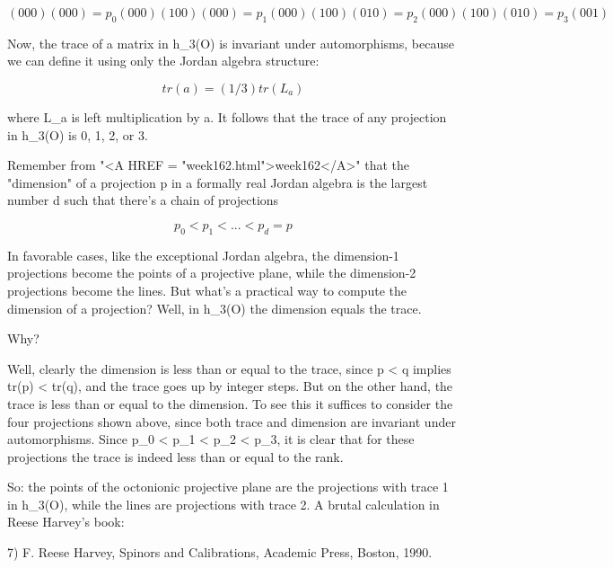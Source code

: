 $$

       ( 0    0    0 )        
       ( 0    0    0 ) = p_{0} 
       ( 0    0    0 )


       ( 1    0    0 )        
       ( 0    0    0 ) = p_{1} 
       ( 0    0    0 ) 


       ( 1    0    0 )        
       ( 0    1    0 ) = p_{2} 
       ( 0    0    0 )


       ( 1    0    0 )       
       ( 0    1    0 ) = p_{3} 
       ( 0    0    1 )
$$
    

Now, the trace of a matrix in h_{3}(O) is invariant under
automorphisms, because we can define it using only the Jordan algebra
structure:


$$

tr(a) = (1/3) tr(L_{a})    
$$
    
where L_{a} is left multiplication by a.  It follows that the trace
of any projection in h_{3}(O) is 0, 1, 2, or 3.  

Remember from "<A HREF = "week162.html">week162</A>" that the
"dimension" of a projection p in a formally real Jordan
algebra is the largest number d such that there's a chain of projections


$$

         p_{0} < p_{1} < ... < p_{d} = p  
$$
    
In favorable cases, like the exceptional Jordan algebra, the dimension-1
projections become the points of a projective plane, while the
dimension-2 projections become the lines.  But what's a practical way to
compute the dimension of a projection?  Well, in h_{3}(O) the
dimension equals the trace.

Why?  

Well, clearly the dimension is less than or equal to the trace, since p
< q implies tr(p) < tr(q), and the trace goes up by integer steps.
But on the other hand, the trace is less than or equal to the dimension.
To see this it suffices to consider the four projections shown above,
since both trace and dimension are invariant under automorphisms.  Since
p_{0} < p_{1} < p_{2} < p_{3}, it is clear that for these projections
the trace is indeed less than or equal to the rank.

So: the points of the octonionic projective plane are the projections
with trace 1 in h_{3}(O), while the lines are projections with
trace 2.  A brutal calculation in Reese Harvey's book:

7) F. Reese Harvey, Spinors and Calibrations, Academic Press, Boston, 1990.

